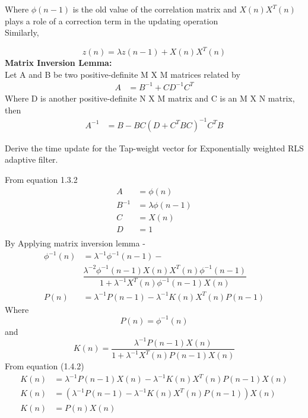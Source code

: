 \documentclass[journal,12pt,twocolumn]{IEEEtran}
\begin{document}
Where $\phi (n-1)$ is the old value of the correlation matrix and $X(n)X^{T}(n)$ plays a role of a correction term in the updating operation\\
Similarly, 

\begin{equation}
z(n)=\lambda z(n-1) + X(n)X^{T}(n)
\end{equation}
\textbf{Matrix Inversion Lemma:}\\
Let A and B be two positive-definite M X M matrices related by
\begin{align*}
A&=B^{-1}+CD^{-1}C^{T}
\end{align*}
Where D is another positive-definite N X M matrix and C is an M X N matrix, then
\begin{align*}
A^{-1}&=B-BC(D+C^{T}BC)^{-1}C^{T}B
\end{align*}
\begin{problem}
Derive the time update for the  Tap-weight vector for Exponentially weighted RLS adaptive filter.
\end{problem}
\solution
From equation 1.3.2 \\
\begin{align*}
 A&=\phi (n)\\
 B^{-1}&=\lambda \phi(n-1)\\
 C&=X(n)\\
 D&=1\\
\end{align*}
By Applying matrix inversion lemma - \\
\begin{align*}
\phi ^{-1} (n) &= \lambda ^{-1} \phi ^{-1} (n-1) - \\ & \dfrac{\lambda ^{-2}\phi ^{-1} (n-1)X(n)X^{T}(n)\phi ^{-1} (n-1)}{1+\lambda ^{-1}X^{T}(n)\phi ^{-1} (n-1)X(n)}\\
P(n)&=\lambda ^{-1}P(n-1) - \lambda ^{-1} K(n)X^{T}(n)P(n-1)
\end{align*}
Where \\
\begin{equation}
P(n)=\phi ^{-1} (n)
\end{equation} and 
\begin{equation}
K(n) = \dfrac{\lambda ^{-1}P(n-1)X(n)}{1+ \lambda ^{-1}X^{T}(n)P(n-1)X(n)}
\end{equation}
From equation (1.4.2)
\begin{align*}
K(n) &=\lambda ^{-1}P(n-1)X(n)-\lambda ^{-1}K(n)X^{T}(n)P(n-1)X(n)\\
K(n)&=(\lambda ^{-1}P(n-1)-\lambda ^{-1}K(n)X^{T}(n)P(n-1))X(n)
\\
K(n)&=P(n)X(n)
\end{align*}
\end{document}
